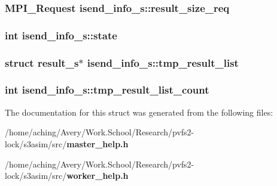 \subsubsection{\setlength{\rightskip}{0pt plus 5cm}MPI\_\-Request \bf{isend\_\-info\_\-s::result\_\-size\_\-req}}\label{structisend__info__s_e5c06932060122d55801c59249089b6a}


\subsubsection{\setlength{\rightskip}{0pt plus 5cm}int \bf{isend\_\-info\_\-s::state}}\label{structisend__info__s_d72b635cb67c12380359417f04e6ce7e}


\subsubsection{\setlength{\rightskip}{0pt plus 5cm}struct \bf{result\_\-s}$\ast$ \bf{isend\_\-info\_\-s::tmp\_\-result\_\-list}}\label{structisend__info__s_3bb719ba62ff8df378cb76d6481669f5}


\subsubsection{\setlength{\rightskip}{0pt plus 5cm}int \bf{isend\_\-info\_\-s::tmp\_\-result\_\-list\_\-count}}\label{structisend__info__s_0bff778f09be41a7a5af0d8737113d7c}




The documentation for this struct was generated from the following files:\begin{CompactItemize}
\item 
/home/aching/Avery/Work.School/Research/pvfs2-lock/s3asim/src/\bf{master\_\-help.h}\item 
/home/aching/Avery/Work.School/Research/pvfs2-lock/s3asim/src/\bf{worker\_\-help.h}\end{CompactItemize}
